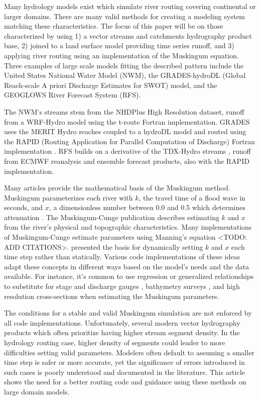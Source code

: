 Many hydrology models exist which simulate river routing covering continental or larger domains.
There are many valid methods for creating a modeling system matching these characteristics.
The focus of this paper will be on those characterized by using 1) a vector streams and catchments hydrography product base, 2) joined to a land surface model providing time series runoff, and 3) applying river routing using an implementation of the Muskingum equation.
Three examples of large scale models fitting the described pattern include the United States National Water Model (NWM), the GRADES-hydroDL (Global Reach-scale A priori Discharge Estimates for SWOT) model, and the GEOGLOWS River Forecast System (RFS).

The NWM's streams stem from the NHDPlus High Resolution dataset, runoff from a WRF-Hydro model \citep{gochis2020, read2023, cosgrove2024}using the t-route \citep{troute_code} Fortran implementation.
GRADES uses the MERIT Hydro reaches \citep{lin2019, yamazaki2019} coupled to a hydroDL \citep{yang2025} model and routed using the RAPID (Routing Application for Parallel Computation of Discharge) Fortran implementation \citep{david2011}.
RFS builds on a derivative of the TDX-Hydro streams \citep{carlson2024}, runoff from ECMWF reanalysis \citep{hersbach2020} and ensemble forecast products, also with the RAPID implementation.

Many articles provide the mathematical basis of the Muskingum method.
Muskingum parameterizes each river with $k$, the travel time of a flood wave in seconds, and $x$, a dimensionless number between 0.0 and 0.5 which determines attenuation \citep{mccarthy1938, chow1988}.
The Muskingum-Cunge publication \citep{cunge1969} describes estimating $k$ and $x$ from the river's physical and topographic characteristics.
Many implementations of Muskingum-Cunge estimate parameters using Manning's equation <TODO: ADD CITATIONS>.
\citet{ponce1978} presented the basis for dynamically setting $k$ and $x$ each time step rather than statically.
Various code implementations of these ideas adapt these concepts in different ways based on the model's needs and the data available.
For instance, it's common to use regression or generalized relationships to substitute for stage and discharge gauges \citep{leopold1953, blackburnlynch2017, heldmyer2022}, bathymetry surveys \citep{andreadis2013, mersel2013, neal2021}, and high resolution cross-sections \citep{bieger2015, zheng2018, read2023} when estimating the Muskingum parameters.

The conditions for a stable and valid Muskingum simulation are not enforced by all code implementations.
Unfortunately, several modern vector hydrography products which often prioritize having higher stream segment density.
In the hydrology routing case, higher density of segments could leader to more difficulties setting valid parameters.
Modelers often default to assuming a smaller time step is safer or more accurate, yet the significance of errors introduced in such cases is poorly understood and documented in the literature.
This article shows the need for a better routing code and guidance using these methods on large domain models.

